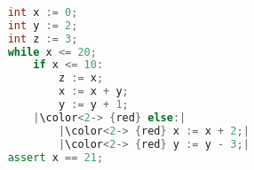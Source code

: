 \begin{lstlisting}[language=C++,basicstyle=\ttfamily,keywordstyle=\color{blue}, escapechar={|}]  % Start your code-block
	
	int x := 0;
	int y := 2;
	int z := 3;
	while x <= 20;
		if x <= 10:
			z := x;
			x := x + y;
			y := y + 1;
		|\color<2-> {red} else:|
			|\color<2-> {red} x := x + 2;|
			|\color<2-> {red} y := y - 3;|
	assert x == 21;
	\end{lstlisting}